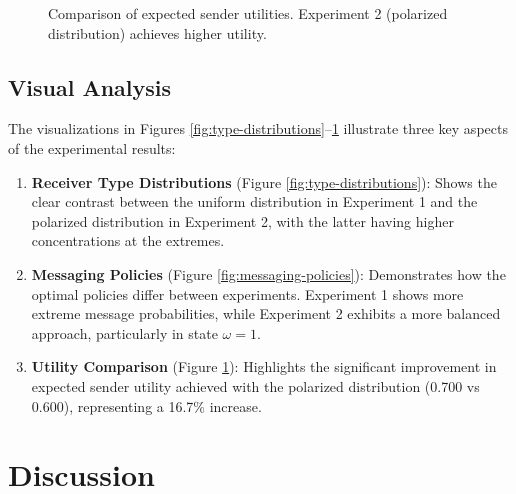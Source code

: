 \documentclass[12pt]{article}
\begin{document}
\begin{figure}[htbp]
\centering
{}
\caption{Comparison of expected sender utilities. Experiment 2 (polarized distribution) achieves higher utility.}
\label{fig:utility-comparison}
\end{figure}

\subsection{Visual Analysis}
The visualizations in Figures \ref{fig:type-distributions}--\ref{fig:utility-comparison} illustrate three key aspects of the experimental results:

\begin{enumerate}
    \item \textbf{Receiver Type Distributions} (Figure \ref{fig:type-distributions}): Shows the clear contrast between the uniform distribution in Experiment 1 and the polarized distribution in Experiment 2, with the latter having higher concentrations at the extremes.
    
    \item \textbf{Messaging Policies} (Figure \ref{fig:messaging-policies}): Demonstrates how the optimal policies differ between experiments. Experiment 1 shows more extreme message probabilities, while Experiment 2 exhibits a more balanced approach, particularly in state $\omega=1$.
    
    \item \textbf{Utility Comparison} (Figure \ref{fig:utility-comparison}): Highlights the significant improvement in expected sender utility achieved with the polarized distribution (0.700 vs 0.600), representing a 16.7\% increase.
\end{enumerate}

\section{Discussion}
\end{document}

